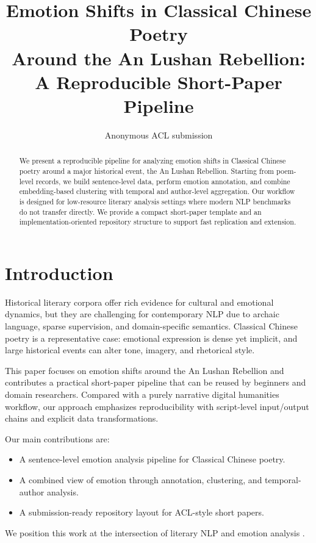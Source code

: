 \documentclass[11pt]{article}
\title{Emotion Shifts in Classical Chinese Poetry\\Around the An Lushan Rebellion: A Reproducible Short-Paper Pipeline}
\author{
Anonymous ACL submission
}
\begin{document}
\maketitle

\begin{abstract}
We present a reproducible pipeline for analyzing emotion shifts in Classical Chinese poetry around a major historical event, the An Lushan Rebellion.
Starting from poem-level records, we build sentence-level data, perform emotion annotation, and combine embedding-based clustering with temporal and author-level aggregation.
Our workflow is designed for low-resource literary analysis settings where modern NLP benchmarks do not transfer directly.
We provide a compact short-paper template and an implementation-oriented repository structure to support fast replication and extension.
\end{abstract}

\section{Introduction}

Historical literary corpora offer rich evidence for cultural and emotional dynamics, but they are challenging for contemporary NLP due to archaic language, sparse supervision, and domain-specific semantics.
Classical Chinese poetry is a representative case: emotional expression is dense yet implicit, and large historical events can alter tone, imagery, and rhetorical style.

This paper focuses on emotion shifts around the An Lushan Rebellion and contributes a practical short-paper pipeline that can be reused by beginners and domain researchers.
Compared with a purely narrative digital humanities workflow, our approach emphasizes reproducibility with script-level input/output chains and explicit data transformations.

Our main contributions are:
\begin{itemize}
    \item A sentence-level emotion analysis pipeline for Classical Chinese poetry.
    \item A combined view of emotion through annotation, clustering, and temporal-author analysis.
    \item A submission-ready repository layout for ACL-style short papers.
\end{itemize}

We position this work at the intersection of literary NLP and emotion analysis
\cite{PLACEHOLDER_literary_nlp_survey,PLACEHOLDER_chinese_emotion_resource}.
\end{document}
